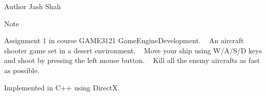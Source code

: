 \begin{DoxyAuthor}{Author}
Jash Shah
\end{DoxyAuthor}
\begin{DoxyNote}{Note}

\end{DoxyNote}
Assignment 1 in course GAME3121 Game\+Engine\+Development. ~\newline
 An aircraft shooter game set in a desert environment. ~\newline
 Move your ship using W/\+A/\+S/D keys and shoot by pressing the left mouse button. ~\newline
 Kill all the enemy aircrafts as fast as possible. ~\newline


Implemented in C++ using DirectX. 